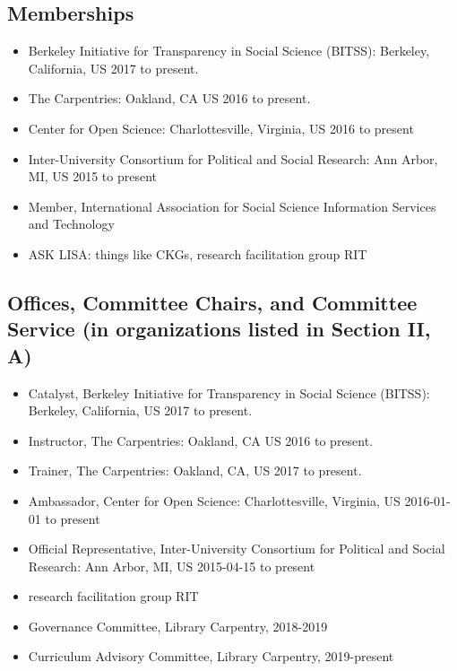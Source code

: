 \subsection{Memberships}

\begin{itemize}
  \item Berkeley Initiative for Transparency in Social Science (BITSS): Berkeley, California, US 2017 to present.
  \item The Carpentries: Oakland, CA US 2016 to present.
  \item Center for Open Science: Charlottesville, Virginia, US 2016 to present
  \item Inter-University Consortium for Political and Social Research: Ann Arbor, MI, US 2015 to present
  \item Member, International Association for Social Science Information Services and Technology
  \item ASK LISA: things like CKGs, research facilitation group RIT
\end{itemize}

\subsection{Offices, Committee Chairs, and Committee Service (in organizations listed in Section II, A)}

\begin{itemize}
    \item Catalyst, Berkeley Initiative for Transparency in Social Science (BITSS): Berkeley, California, US 2017 to present.
    \item Instructor, The Carpentries: Oakland, CA US 2016 to present.
    \item Trainer, The Carpentries: Oakland, CA, US  2017 to present.
    \item Ambassador, Center for Open Science: Charlottesville, Virginia, US 2016-01-01 to present
    \item Official Representative, Inter-University Consortium for Political and Social Research: Ann Arbor, MI, US 2015-04-15 to present
    \item research facilitation group RIT
    \item Governance Committee, Library Carpentry, 2018-2019
    \item Curriculum Advisory Committee, Library Carpentry, 2019-present
\end{itemize}

